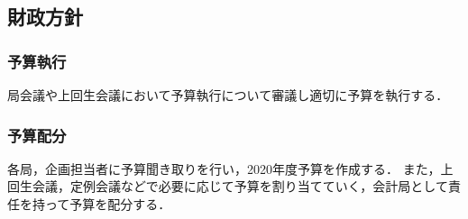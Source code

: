 \subsection*{財政方針}


\subsubsection*{予算執行}
局会議や上回生会議において予算執行について審議し適切に予算を執行する．
\subsubsection*{予算配分}
各局，企画担当者に予算聞き取りを行い，2020年度予算を作成する．
また，上回生会議，定例会議などで必要に応じて予算を割り当てていく，会計局として責任を持って予算を配分する．
